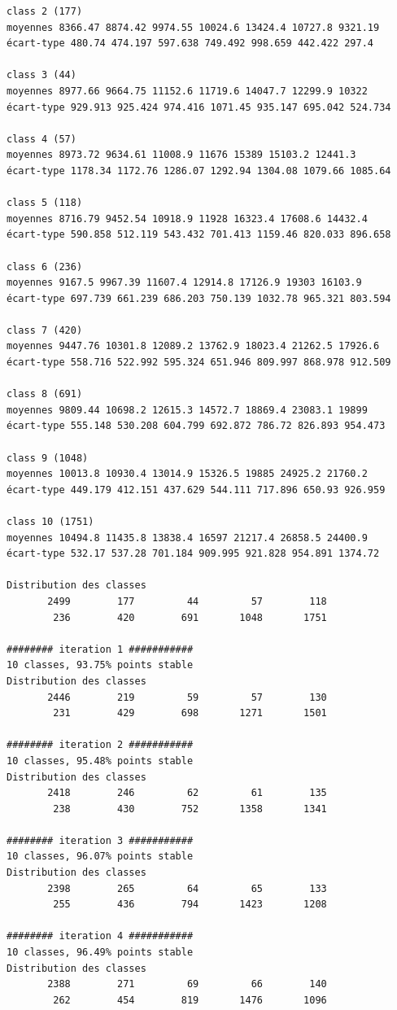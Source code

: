 \documentclass[earth,article,submit,pdftex,moreauthors]{Definitions/mdpi}
\begin{document}
\begin{scriptsize}
\begin{verbatim}
class 2 (177)
moyennes 8366.47 8874.42 9974.55 10024.6 13424.4 10727.8 9321.19
écart-type 480.74 474.197 597.638 749.492 998.659 442.422 297.4

class 3 (44)
moyennes 8977.66 9664.75 11152.6 11719.6 14047.7 12299.9 10322
écart-type 929.913 925.424 974.416 1071.45 935.147 695.042 524.734

class 4 (57)
moyennes 8973.72 9634.61 11008.9 11676 15389 15103.2 12441.3
écart-type 1178.34 1172.76 1286.07 1292.94 1304.08 1079.66 1085.64

class 5 (118)
moyennes 8716.79 9452.54 10918.9 11928 16323.4 17608.6 14432.4
écart-type 590.858 512.119 543.432 701.413 1159.46 820.033 896.658

class 6 (236)
moyennes 9167.5 9967.39 11607.4 12914.8 17126.9 19303 16103.9
écart-type 697.739 661.239 686.203 750.139 1032.78 965.321 803.594

class 7 (420)
moyennes 9447.76 10301.8 12089.2 13762.9 18023.4 21262.5 17926.6
écart-type 558.716 522.992 595.324 651.946 809.997 868.978 912.509

class 8 (691)
moyennes 9809.44 10698.2 12615.3 14572.7 18869.4 23083.1 19899
écart-type 555.148 530.208 604.799 692.872 786.72 826.893 954.473

class 9 (1048)
moyennes 10013.8 10930.4 13014.9 15326.5 19885 24925.2 21760.2
écart-type 449.179 412.151 437.629 544.111 717.896 650.93 926.959

class 10 (1751)
moyennes 10494.8 11435.8 13838.4 16597 21217.4 26858.5 24400.9
écart-type 532.17 537.28 701.184 909.995 921.828 954.891 1374.72

Distribution des classes
       2499        177         44         57        118
        236        420        691       1048       1751

######## iteration 1 ###########
10 classes, 93.75% points stable
Distribution des classes
       2446        219         59         57        130
        231        429        698       1271       1501

######## iteration 2 ###########
10 classes, 95.48% points stable
Distribution des classes
       2418        246         62         61        135
        238        430        752       1358       1341

######## iteration 3 ###########
10 classes, 96.07% points stable
Distribution des classes
       2398        265         64         65        133
        255        436        794       1423       1208

######## iteration 4 ###########
10 classes, 96.49% points stable
Distribution des classes
       2388        271         69         66        140
        262        454        819       1476       1096


\end{verbatim}
\end{scriptsize}
\end{document}
